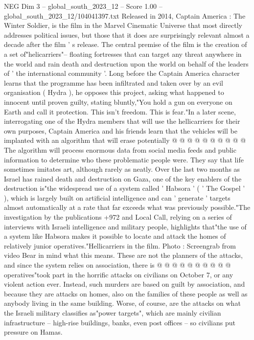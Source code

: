 \begin{textsample}{NEG Dim 3 – global\_south\_2023\_12 – Score 1.00 – global\_south\_2023\_12/104041397.txt}  \label{ex:f3_neg_001}
Released in 2014, Captain America : The Winter Soldier, is the film in the Marvel Cinematic Universe that most directly addresses political issues, but those that it does are surprisingly relevant almost a decade after the film ' s release.
The central premise of the film is the creation of a set of"helicarriers"-- floating fortresses that can target any threat anywhere in the world and rain death and destruction upon the world on behalf of the leaders of ' the international community '.
Long before the Captain America character learns that the programme has been infiltrated and taken over by an evil organisation ( Hydra ), he opposes this project, asking what happened to innocent until proven guilty, stating bluntly,"You hold a gun on everyone on Earth and call it protection.
This isn't freedom.
This is fear."In a later scene, interrogating one of the Hydra members that will use the hellicarriers for their own purposes, Captain America and his friends learn that the vehicles will be implanted with an algorithm that will erase potentially @ @ @ @ @ @ @ @ @ @ The algorithm will process enormous data from social media feeds and public information to determine who these problematic people were.
They say that life sometimes imitates art, although rarely as neatly.
Over the last two months as Israel has rained death and destruction on Gaza, one of the key enablers of the destruction is"the widespread use of a system called ' Habsora ' ( ' The Gospel ' ), which is largely built on artificial intelligence and can ' generate ' targets almost automatically at a rate that far exceeds what was previously possible."The investigation by the publications +972 and Local Call, relying on a series of interviews with Israeli intelligence and military people, highlights that"the use of a system like Habsora makes it possible to locate and attack the homes of relatively junior operatives."Hellicarriers in the film.
Photo : Screengrab from video Bear in mind what this means.
These are not the planners of the attacks, and since the system relies on association, there is @ @ @ @ @ @ @ @ @ @ operatives"took part in the horrific attacks on civilians on October 7, or any violent action ever.
Instead, such murders are based on guilt by association, and because they are attacks on homes, also on the families of these people as well as anybody living in the same building.
Worse, of course, are the attacks on what the Israeli military classifies as"power targets", which are mainly civilian infrastructure -- high-rise buildings, banks, even post offices -- so civilians put pressure on Hamas.

\end{textsample}
